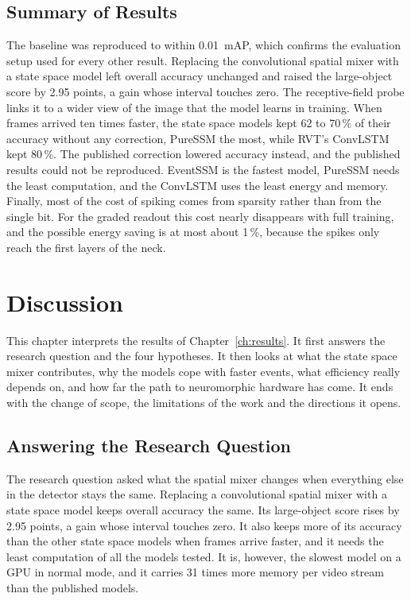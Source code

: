 \documentclass[11pt, a4paper]{report}
\begin{document}
\section{Summary of Results}
\label{sec:results_summary}
The baseline was reproduced to within 0.01~mAP, which confirms the evaluation setup used for every other result.
Replacing the convolutional spatial mixer with a state space model left overall accuracy unchanged and
raised the large-object score by 2.95 points, a gain whose interval touches zero. The
receptive-field probe links it to a wider view of the image that the model learns in training. When frames
arrived ten times faster, the state space models kept 62 to 70\,\% of their accuracy without any correction,
PureSSM the most, while RVT's ConvLSTM kept 80\,\%. The published correction lowered accuracy instead, and
the published results could not be reproduced. EventSSM is the fastest model, PureSSM needs the least computation, and the ConvLSTM uses the least energy and memory. Finally,
most of the cost of spiking comes from sparsity rather than from the single bit. For the graded
readout this cost nearly disappears with full training, and the possible energy saving is at most about
1\,\%, because the spikes only reach the first layers of the neck.

\chapter{Discussion}
\label{ch:discussion}
This chapter interprets the results of Chapter~\ref{ch:results}. It first answers the research question and the four hypotheses. It then looks at what the state space mixer contributes, why the models cope with faster events, what efficiency really depends on, and how far the
path to neuromorphic hardware has come. It ends with the change of scope, the limitations of the work and the directions it opens.

\section{Answering the Research Question}
\label{sec:answer_rq}
The research question asked what the spatial mixer changes when everything else in the detector stays the same. Replacing a convolutional spatial mixer with a state space model keeps overall
accuracy the same. Its large-object score rises by 2.95 points, a gain whose interval touches zero. It also keeps more of its
accuracy than the other state space models when frames arrive faster, and it needs the least computation of
all the models tested. It is, however, the slowest model on a GPU in normal mode, and it carries 31 times more memory per video stream than the published models.
\end{document}
